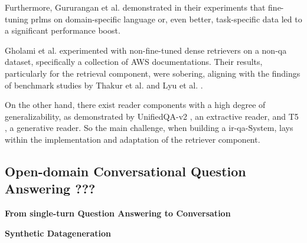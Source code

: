Furthermore, Gururangan et al. \cite{gururangan_dont_2020} demonstrated in their experiments that fine-tuning \glspl{prlm} on domain-specific language or, even better, task-specific data led to a significant performance boost.

Gholami et al. \cite{gholami_zero-shot_2021} experimented with non-fine-tuned dense retrievers on a non-\gls{qa} dataset, specifically a collection of AWS documentations. Their results, particularly for the retrieval component, were sobering, aligning with the findings of benchmark studies by Thakur et al. \cite{thakur_beir_2021} and Lyu et al. \cite{farea_evaluation_2022}.

On the other hand, there exist reader components with a high degree of generalizability, as demonstrated by UnifiedQA-v2 \cite{khashabi_unifiedqa-v2_2022}, an extractive reader, and T5 \cite{raffel_exploring_2023}, a generative reader. So the main challenge, when building a \gls{ir}-\gls{qa}-System, lays within the implementation and adaptation of the retriever component.


\subsection{Open-domain Conversational Question Answering ???} 
\label{subsec:related_work_cqa}

\textbf{From single-turn Question Answering to Conversation}

\textbf{Synthetic Datageneration}

